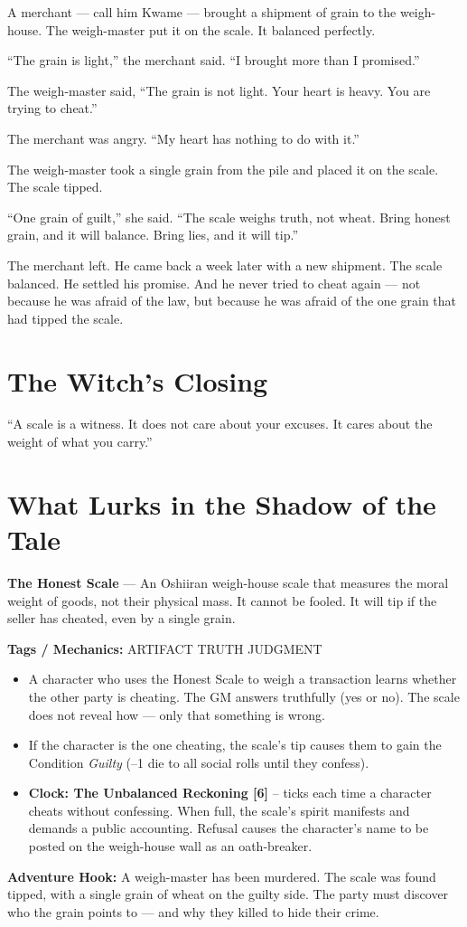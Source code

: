 \documentclass[10pt,twoside]{book}
\newcommand{\tag}[1]{\textsc{#1}}
\begin{document}
A merchant --- call him Kwame --- brought a shipment of grain to the weigh-house. The weigh-master put it on the scale. It balanced perfectly.

``The grain is light,'' the merchant said. ``I brought more than I promised.''

The weigh-master said, ``The grain is not light. Your heart is heavy. You are trying to cheat.''

The merchant was angry. ``My heart has nothing to do with it.''

The weigh-master took a single grain from the pile and placed it on the scale. The scale tipped.

``One grain of guilt,'' she said. ``The scale weighs truth, not wheat. Bring honest grain, and it will balance. Bring lies, and it will tip.''

The merchant left. He came back a week later with a new shipment. The scale balanced. He settled his promise. And he never tried to cheat again --- not because he was afraid of the law, but because he was afraid of the one grain that had tipped the scale.

\section*{The Witch's Closing}
``A scale is a witness. It does not care about your excuses. It cares about the weight of what you carry.''

\section*{What Lurks in the Shadow of the Tale}
\begin{infobox}
\textbf{The Honest Scale} --- An Oshiiran weigh-house scale that measures the moral weight of goods, not their physical mass. It cannot be fooled. It will tip if the seller has cheated, even by a single grain.

\textbf{Tags / Mechanics:} \tag{ARTIFACT} \tag{TRUTH} \tag{JUDGMENT}

\begin{itemize}
\item A character who uses the Honest Scale to weigh a transaction learns whether the other party is cheating. The GM answers truthfully (yes or no). The scale does not reveal how --- only that something is wrong.
\item If the character is the one cheating, the scale's tip causes them to gain the Condition \textit{Guilty} (--1 die to all social rolls until they confess).
\item \textbf{Clock: The Unbalanced Reckoning [6]} -- ticks each time a character cheats without confessing. When full, the scale's spirit manifests and demands a public accounting. Refusal causes the character's name to be posted on the weigh-house wall as an oath-breaker.
\end{itemize}

\textbf{Adventure Hook:} A weigh-master has been murdered. The scale was found tipped, with a single grain of wheat on the guilty side. The party must discover who the grain points to --- and why they killed to hide their crime.
\end{infobox}
\end{document}
